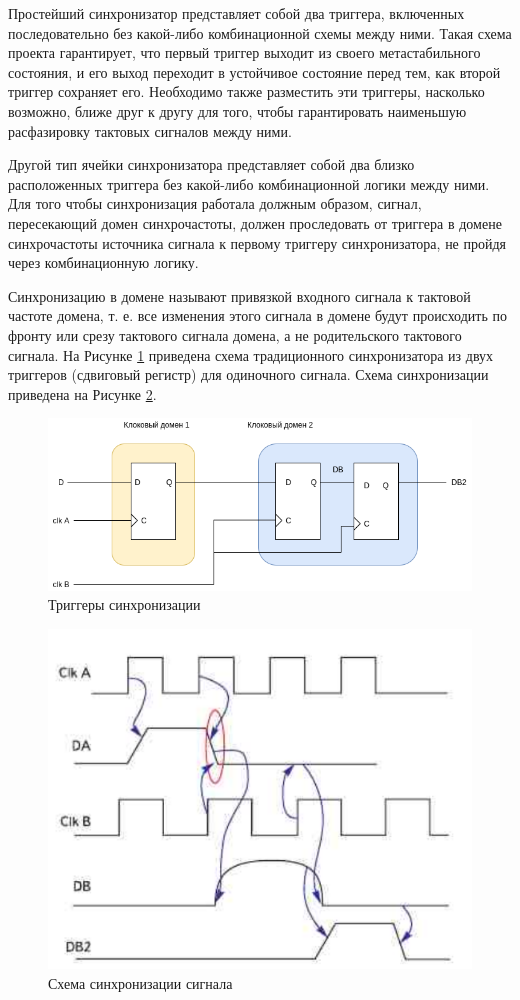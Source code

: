 Простейший синхронизатор представляет собой два триггера, включенных последовательно без какой-либо комбинационной схемы между ними. Такая схема проекта гарантирует, что первый триггер выходит из своего метастабильного состояния, и его выход переходит в устойчивое состояние перед тем, как второй триггер сохраняет его. Необходимо также разместить эти триггеры, насколько возможно, ближе друг к другу для того, чтобы гарантировать наименьшую расфазировку тактовых сигналов между ними. 

Другой тип ячейки синхронизатора представляет собой два близко расположенных триггера без какой-либо комбинационной логики между ними. Для того чтобы синхронизация работала должным образом, сигнал, пересекающий домен синхрочастоты, должен проследовать от триггера в домене синхрочастоты источника сигнала к первому триггеру синхронизатора, не пройдя через комбинационную логику.

Синхронизацию в домене называют привязкой входного сигнала к тактовой частоте
домена, т. е. все изменения этого сигнала в домене будут происходить по фронту или срезу
тактового сигнала домена, а не родительского тактового сигнала. На Рисунке \ref{fig:sync-triggers} приведена схема традиционного синхронизатора из
двух триггеров (сдвиговый регистр) для одиночного сигнала. Схема синхронизации приведена на Рисунке \ref {fig:sync-scheme}.

\begin{figure}[h!]
	\centering
	\includegraphics[width=0.6\linewidth]{course-scheme/images/sync-triggers}
	\caption{Триггеры синхронизации}
	\label{fig:sync-triggers}
\end{figure}

\begin{figure}[h!]
	\centering
	\includegraphics[width=0.3\linewidth]{course-scheme/images/sync-scheme}
	\caption{Схема синхронизации сигнала}
	\label{fig:sync-scheme}
\end{figure}

